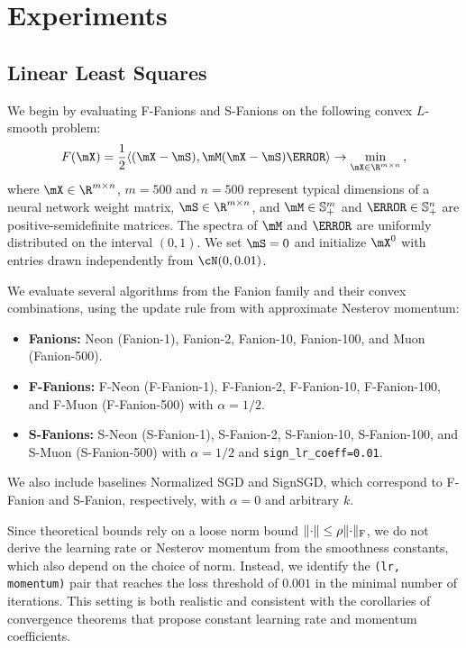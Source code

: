 \documentclass[pmlr]{jmlr}%
\newcommand{\norm}[1]{\lVert #1\rVert}
\DeclarePairedDelimiter{\normf}{\|}{\|_\mathrm{F}}
\def\<#1,#2>{\langle #1,#2\rangle}
\newcommand{\Rmn}{\R^{m\times n}}
\begin{document}
 \section{Experiments}\label{sec:experiments}
 
 \subsection{Linear Least Squares}
 \label{subsec:lls_exps}
 
 We begin by evaluating F-Fanions and S-Fanions on the following convex $L$-smooth problem:
 \begin{equation}\label{eq:lls}
   F(\mX) = \frac{1}{2} \<(\mX-\mS), \mM (\mX - \mS) \mN> \to \min_{\mX \in \Rmn}\,,
 \end{equation}
 where $\mX \in \Rmn$, $m=500$ and $n=500$ represent typical dimensions of a neural network weight matrix, $\mS \in \Rmn$, and $\mM \in \mathbb{S}^m_{+}$ and $\mN \in \mathbb{S}^n_{+}$ are positive-semidefinite matrices. The spectra of $\mM$ and $\mN$ are uniformly distributed on the interval $(0, 1)$. We set $\mS=0$ and initialize $\mX^0$ with entries drawn independently from $\cN(0, 0.01)$.
 
 We evaluate several algorithms from the Fanion family and their convex combinations, using the update rule from  with approximate Nesterov momentum:
 \begin{itemize}
   \item \textbf{Fanions:} Neon (Fanion-1), Fanion-2, Fanion-10, Fanion-100, and Muon (Fanion-500).
   \item \textbf{F-Fanions:} F-Neon (F-Fanion-1), F-Fanion-2, F-Fanion-10, F-Fanion-100, and F-Muon (F-Fanion-500) with $\alpha=1/2$.
   \item \textbf{S-Fanions:} S-Neon (S-Fanion-1), S-Fanion-2, S-Fanion-10, S-Fanion-100, and S-Muon (S-Fanion-500) with $\alpha=1/2$ and \texttt{sign\_lr\_coeff=0.01}.
 \end{itemize}
 We also include baselines Normalized SGD and SignSGD, which correspond to F-Fanion and S-Fanion, respectively, with $\alpha = 0$ and arbitrary $k$.
 
 Since theoretical bounds \citep{kovalev2025understanding, riabinin2025gluon} rely on a loose norm bound $\norm{\cdot}\le \rho \normf{\cdot}$, we do not derive the learning rate or Nesterov momentum from the smoothness constants, which also depend on the choice of norm. Instead, we identify the \texttt{(lr, momentum)} pair that reaches the loss threshold of $0.001$ in the minimal number of iterations. This setting is both realistic and consistent with the corollaries of convergence theorems that propose constant learning rate and momentum coefficients.
 
\end{document}

